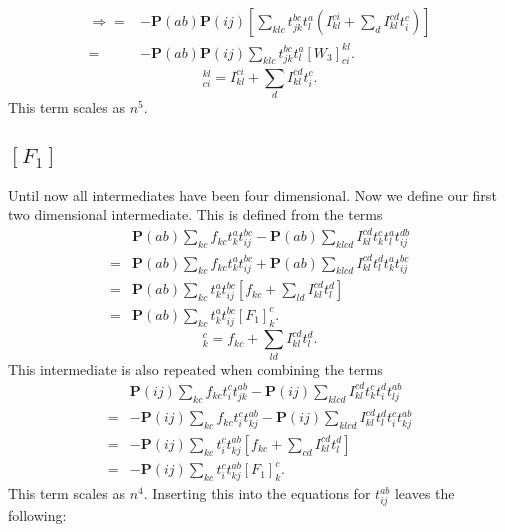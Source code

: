 \documentclass[graybox,sectrefs,envcountresetchap,open=right]{svmonodo}
\begin{document}
\begin{align}
\Rightarrow = &
- \mathbf{P}(ab) \mathbf{P}(ij) \left[ \sum_{klc} t_{jk}^{bc} t_l^a \left(
 I_{kl}^{ci} + \sum_d I_{kl}^{cd} t_i^c \right) \right] \nonumber \\
= &
- \mathbf{P}(ab) \mathbf{P}(ij) \sum_{klc}
t_{jk}^{bc} t_l^a
 [W_3]_{ci}^{kl} .
\end{align}
\begin{equation}
[W_3]_{ci}^{kl} = I_{kl}^{ci} + \sum_d I_{kl}^{cd} t_i^c  . \label{intermedW3}
\end{equation}
This term scales as $n^5$.

\subsection{$[F_1]$}
Until now all intermediates have been four dimensional. Now we define our first two dimensional intermediate. This is defined from the terms
\begin{align}
& \mathbf{P}(ab) \sum_{kc} f_{kc} t_k^a t_{ij}^{bc}
- \mathbf{P}(ab) \sum_{klcd} I_{kl}^{cd} t_k^c t_l^a t_{ij}^{db} \nonumber \\ 
= & 
\mathbf{P}(ab) \sum_{kc} f_{kc} t_k^a t_{ij}^{bc}
+ \mathbf{P}(ab) \sum_{klcd} I_{kl}^{cd} t_l^d t_k^a t_{ij}^{bc} \nonumber \\
= &
\mathbf{P}(ab) \sum_{kc} t_k^a t_{ij}^{bc} \left[ f_{kc} + \sum_{ld} I_{kl}^{cd} t_l^d \right] \nonumber \\
= &
\mathbf{P}(ab) \sum_{kc} t_k^a t_{ij}^{bc} [F_1]_k^c .
\end{align}
\begin{equation}
[F_1]_k^c = f_{kc} + \sum_{ld} I_{kl}^{cd} t_l^d . \label{intermedF1}
\end{equation}
This intermediate is also repeated when combining the terms
\begin{align}
& \mathbf{P}(ij) \sum_{kc} f_{kc} t_i^c t_{jk}^{ab}
- \mathbf{P}(ij) \sum_{klcd} I_{kl}^{cd} t_k^c t_i^d t_{lj}^{ab} \nonumber \\ 
= &
- \mathbf{P}(ij) \sum_{kc} f_{kc} t_i^c t_{kj}^{ab}
- \mathbf{P}(ij) \sum_{klcd} I_{kl}^{cd} t_l^d t_i^c t_{kj}^{ab} \nonumber \\
= &
- \mathbf{P}(ij) \sum_{kc} t_i^c t_{kj}^{ab} \left[
f_{kc} + \sum_{cd} I_{kl}^{cd} t_l^d \right] \nonumber \\ 
= &
- \mathbf{P}(ij) \sum_{kc} t_i^c t_{kj}^{ab} [F_1]_k^c
.
\end{align}
This term scales as $n^4$. Inserting this into the equations for $t_{ij}^{ab}$ leaves the following:
\end{document}
